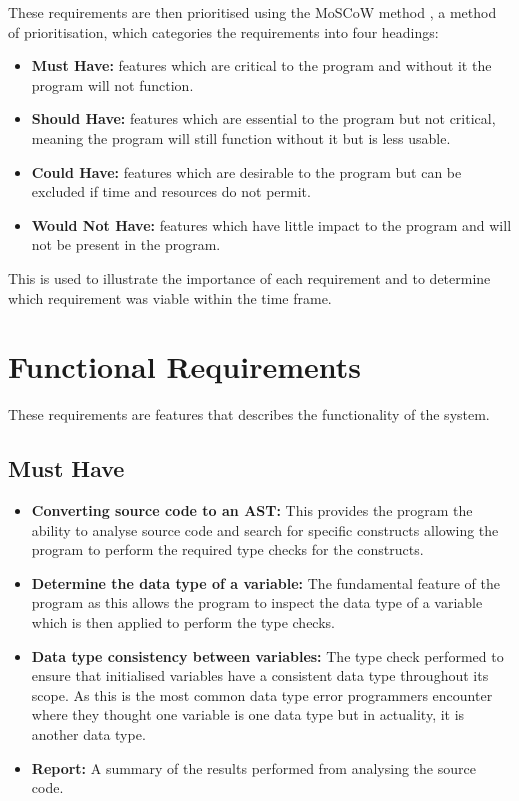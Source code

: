 \documentclass{l4proj}
\begin{document}
These requirements are then prioritised using the MoSCoW method \cite{moSCoW}, a method of prioritisation, which categories the requirements into four headings:
\begin{itemize}
    \item \textbf{Must Have:} features which are critical to the program and without it the program will not function.
    \item \textbf{Should Have:} features which are essential to the program but not critical, meaning the program will still function without it but is less usable.
    \item \textbf{Could Have:} features which are desirable to the program but can be excluded if time and resources do not permit.
    \item \textbf{Would Not Have:} features which have little impact to the program and will not be present in the program.
\end{itemize}
This is used to illustrate the importance of each requirement and to determine which requirement was viable within the time frame.

\clearpage
\section{Functional Requirements}
These requirements are features that describes the functionality of the system. 

\subsection{Must Have}
\begin{itemize}
    \item \textbf{Converting source code to an AST:} This provides the program the ability to analyse source code and search for specific constructs allowing the program to perform the required type checks for the constructs.
    \item \textbf{Determine the data type of a variable:} The fundamental feature of the program as this allows the program to inspect the data type of a variable which is then applied to perform the type checks.
    \item \textbf{Data type consistency between variables:} The type check performed to ensure that initialised variables have a consistent data type throughout its scope. As this is the most common data type error programmers encounter where they thought one variable is one data type but in actuality, it is another data type.
    \item \textbf{Report:} A summary of the results performed from analysing the source code.
\end{itemize}
\end{document}
